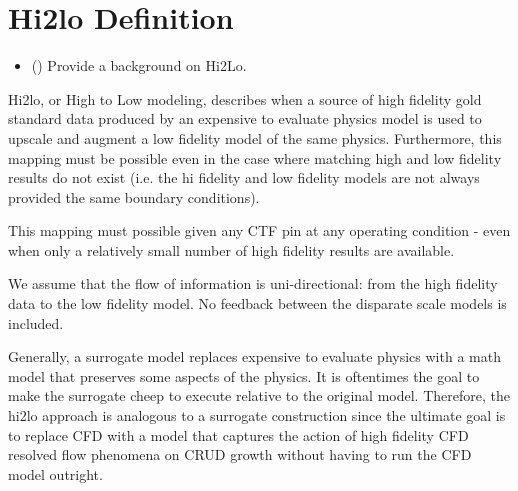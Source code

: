 \section{Hi2lo Definition}

\begin{itemize}
    \item (\checkmark) Provide a background on Hi2Lo.
\end{itemize}

Hi2lo, or High to Low modeling, describes when a source of high fidelity gold standard data produced by an expensive to evaluate physics model is used to upscale and augment a low fidelity model of the same physics.
Furthermore, this mapping must be possible even in the case where matching high and low fidelity results do not exist (i.e. the hi fidelity and low fidelity models are not always provided the same boundary conditions).

This mapping must possible given any CTF pin at any operating condition - even when only a relatively small number of high fidelity results are available.

We assume that the flow of information is uni-directional: from the high fidelity data to the low fidelity model.  No feedback between the disparate scale models is included.

Generally, a surrogate model replaces expensive to evaluate physics with a math model that preserves some aspects of the physics.  It is oftentimes the goal to make the surrogate cheep to execute relative to the original model. Therefore, the hi2lo approach is analogous to a surrogate construction since the ultimate goal is to replace CFD with a model that captures the action of high fidelity CFD resolved flow phenomena on CRUD growth without having to run the CFD model outright.


